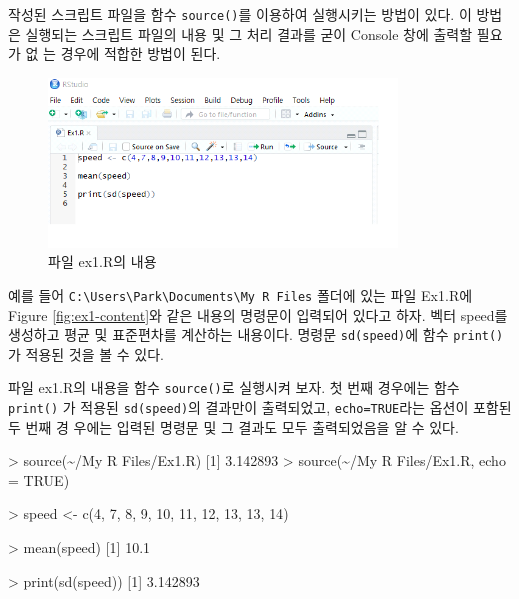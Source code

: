 \documentclass[
]{book}
\newenvironment{Shaded}{\begin{snugshade}}{\end{snugshade}}
\newcommand{\AttributeTok}[1]{\textcolor[rgb]{0.77,0.63,0.00}{#1}}
\newcommand{\ConstantTok}[1]{\textcolor[rgb]{0.00,0.00,0.00}{#1}}
\newcommand{\DecValTok}[1]{\textcolor[rgb]{0.00,0.00,0.81}{#1}}
\newcommand{\FloatTok}[1]{\textcolor[rgb]{0.00,0.00,0.81}{#1}}
\newcommand{\FunctionTok}[1]{\textcolor[rgb]{0.00,0.00,0.00}{#1}}
\newcommand{\NormalTok}[1]{#1}
\newcommand{\OtherTok}[1]{\textcolor[rgb]{0.56,0.35,0.01}{#1}}
\newcommand{\SpecialCharTok}[1]{\textcolor[rgb]{0.00,0.00,0.00}{#1}}
\newcommand{\StringTok}[1]{\textcolor[rgb]{0.31,0.60,0.02}{#1}}
\begin{document}
작성된 스크립트 파일을 함수 \texttt{source()}를 이용하여 실행시키는 방법이
있다. 이 방법은 실행되는 스크립트 파일의 내용 및 그 처리 결과를 굳이
Console 창에 출력할 필요가 없 는 경우에 적합한 방법이 된다.

\begin{figure}
\hypertarget{ex1-content}{%
\centering
\includegraphics[width=3.64583in,height=\textheight]{Figure/ex1_content.png}
\caption{파일 ex1.R의
내용}\label{ex1-content}
}
\end{figure}

예를 들어 \texttt{C:\textbackslash{}Users\textbackslash{}Park\textbackslash{}Documents\textbackslash{}My\ R\ Files} 폴더에 있는 파일 Ex1.R에
Figure \ref{fig:ex1-content}와 같은 내용의 명령문이 입력되어 있다고
하자. 벡터 speed를 생성하고 평균 및 표준편차를 계산하는 내용이다. 명령문
\texttt{sd(speed)}에 함수 \texttt{print()}가 적용된 것을 볼 수 있다.

파일 ex1.R의 내용을 함수 \texttt{source()}로 실행시켜 보자. 첫 번째 경우에는
함수 \texttt{print()} 가 적용된 \texttt{sd(speed)}의 결과만이 출력되었고,
\texttt{echo=TRUE}라는 옵션이 포함된 두 번째 경 우에는 입력된 명령문 및 그
결과도 모두 출력되었음을 알 수 있다.

\begin{Shaded}
\begin{Highlighting}[]
\SpecialCharTok{\textgreater{}} \FunctionTok{source}\NormalTok{(}\StringTok{\textquotesingle{}\textasciitilde{}/My R Files/Ex1.R\textquotesingle{}}\NormalTok{)}
\NormalTok{[}\DecValTok{1}\NormalTok{] }\FloatTok{3.142893}
\SpecialCharTok{\textgreater{}} \FunctionTok{source}\NormalTok{(}\StringTok{\textquotesingle{}\textasciitilde{}/My R Files/Ex1.R\textquotesingle{}}\NormalTok{, }\AttributeTok{echo =} \ConstantTok{TRUE}\NormalTok{)}

\SpecialCharTok{\textgreater{}}\NormalTok{ speed }\OtherTok{\textless{}{-}} \FunctionTok{c}\NormalTok{(}\DecValTok{4}\NormalTok{, }\DecValTok{7}\NormalTok{, }\DecValTok{8}\NormalTok{, }\DecValTok{9}\NormalTok{, }\DecValTok{10}\NormalTok{, }\DecValTok{11}\NormalTok{, }\DecValTok{12}\NormalTok{, }\DecValTok{13}\NormalTok{, }\DecValTok{13}\NormalTok{, }\DecValTok{14}\NormalTok{)}

\SpecialCharTok{\textgreater{}} \FunctionTok{mean}\NormalTok{(speed)}
\NormalTok{[}\DecValTok{1}\NormalTok{] }\FloatTok{10.1}

\SpecialCharTok{\textgreater{}} \FunctionTok{print}\NormalTok{(}\FunctionTok{sd}\NormalTok{(speed))}
\NormalTok{[}\DecValTok{1}\NormalTok{] }\FloatTok{3.142893}
\end{Highlighting}
\end{Shaded}
\end{document}
